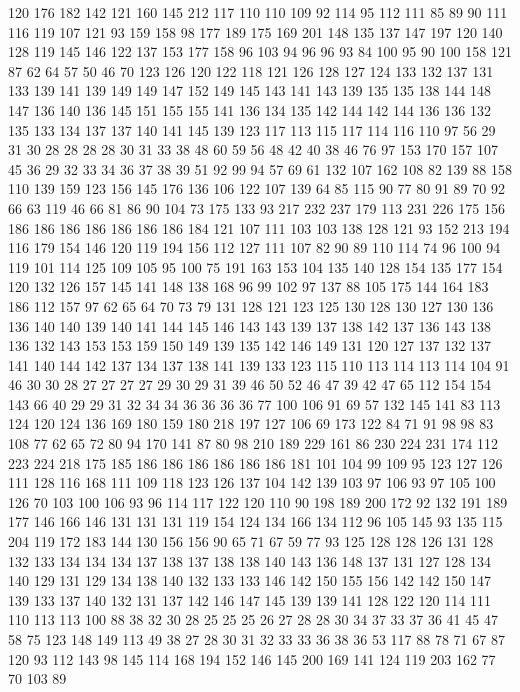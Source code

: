 120 176 182 142 121 160 145 212 117 110 110 109 92 114 95 112 111 85 89 90
111 116 119 107 121 93 159 158 98 177 189 175 169 201 148 135 137 147 197 120
140 128 119 145 146 122 137 153 177 158 96 103 94 96 96 93 84 100 95 90
100 158 121 87 62 64 57 50 46 70 123 126 120 122 118 121 126 128 127 124
133 132 137 131 133 139 141 139 149 149 147 152 149 145 143 141 143 139 135 135
138 144 148 147 136 140 136 145 151 155 155 141 136 134 135 142 144 142 144 136
136 132 135 133 134 137 137 140 141 145 139 123 117 113 115 117 114 116 110 97
56 29 31 30 28 28 28 28 30 31 33 38 48 60 59 56 48 42 40 38
46 76 97 153 170 157 107 45 36 29 32 33 34 36 37 38 39 51 92 99
94 57 69 61 132 107 162 108 82 139 88 158 110 139 159 123 156 145 176 136
106 122 107 139 64 85 115 90 77 80 91 89 70 92 66 63 119 46 66 81
86 90 104 73 175 133 93 217 232 237 179 113 231 226 175 156 186 186 186 186
186 186 186 184 121 107 111 103 103 138 128 121 93 152 213 194 116 179 154 146
120 119 194 156 112 127 111 107 82 90 89 110 114 74 96 100 94 119 101 114
125 109 105 95 100 75 191 163 153 104 135 140 128 154 135 177 154 120 132 126
157 145 141 148 138 168 96 99 102 97 137 88 105 175 144 164 183 186 112 157
97 62 65 64 70 73 79 131 128 121 123 125 130 128 130 127 130 136 136 140
140 139 140 141 144 145 146 143 143 139 137 138 142 137 136 143 138 136 132 143
153 153 159 150 149 139 135 142 146 149 131 120 127 137 132 137 141 140 144 142
137 134 137 138 141 139 133 123 115 110 113 114 113 114 104 91 46 30 30 28
27 27 27 27 29 30 29 31 39 46 50 52 46 47 39 42 47 65 112 154
154 143 66 40 29 29 31 32 34 34 36 36 36 36 77 100 106 91 69 57
132 145 141 83 113 124 120 124 136 169 180 159 180 218 197 127 106 69 173 122
84 71 91 98 98 83 108 77 62 65 72 80 94 170 141 87 80 98 210 189
229 161 86 230 224 231 174 112 223 224 218 175 185 186 186 186 186 186 186 181
101 104 99 109 95 123 127 126 111 128 116 168 111 109 118 123 126 137 104 142
139 103 97 106 93 97 105 100 126 70 103 100 106 93 96 114 117 122 120 110
90 198 189 200 172 92 132 191 189 177 146 166 146 131 131 131 119 154 124 134
166 134 112 96 105 145 93 135 115 204 119 172 183 144 130 156 156 90 65 71
67 59 77 93 125 128 128 126 131 128 132 133 134 134 134 137 138 137 138 138
140 143 136 148 137 131 127 128 134 140 129 131 129 134 138 140 132 133 133 146
142 150 155 156 142 142 150 147 139 133 137 140 132 131 137 142 146 147 145 139
139 141 128 122 120 114 111 110 113 113 100 88 38 32 30 28 25 25 25 26
27 28 28 30 34 37 33 37 36 41 45 47 58 75 123 148 149 113 49 38
27 28 30 31 32 33 33 36 38 36 53 117 88 78 71 67 87 120 93 112
143 98 145 114 168 194 152 146 145 200 169 141 124 119 203 162 77 70 103 89
